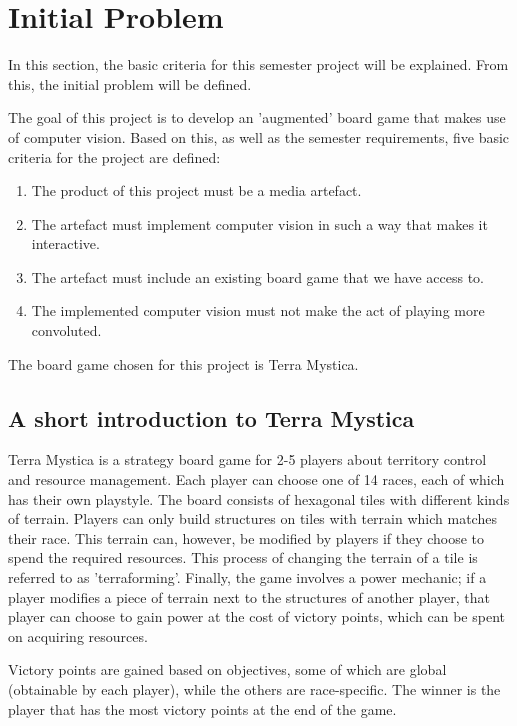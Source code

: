 \chapter{Initial Problem}\label{ch:iniprob}
In this section, the basic criteria for this semester project will be explained. From this, the initial problem will be defined.

The goal of this project is to develop an 'augmented' board game that makes use of computer vision. Based on this, as well as the semester requirements, five basic criteria for the project are defined:

\begin{enumerate}
	\item The product of this project must be a media artefact.
	\item The artefact must implement computer vision in such a way that makes it interactive.
	\item The artefact must include an existing board game that we have access to.
	\item The implemented computer vision must not make the act of playing more convoluted.
\end{enumerate}

The board game chosen for this project is Terra Mystica.

\section{A short introduction to Terra Mystica}
Terra Mystica is a strategy board game for 2-5 players about territory control and resource management. Each player can choose one of 14 races, each of which has their own playstyle. The board consists of hexagonal tiles  with different kinds of terrain. Players can only build structures on tiles with terrain which matches their race. This terrain can, however, be modified by players if they choose to spend the required resources. This process of changing the terrain of a tile is referred to as 'terraforming'. Finally, the game involves a power mechanic; if a player modifies a piece of terrain next to the structures of another player, that player can choose to gain power at the cost of victory points, which can be spent on acquiring resources.  

Victory points are gained based on objectives, some of which are global (obtainable by each player), while the others are race-specific. The winner is the player that has the most victory points at the end of the game.


